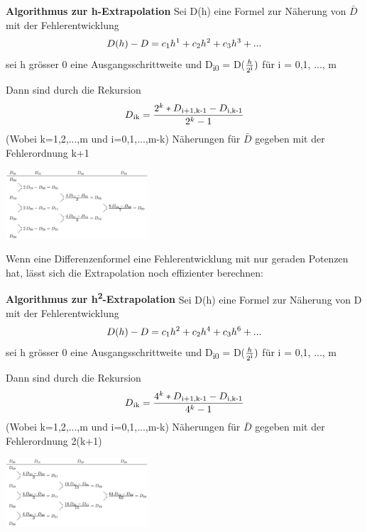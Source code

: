 \documentclass{article}
\newenvironment{Figure}
	{\par\medskip\noindent\minipage{\linewidth}}
	{\endminipage\par\medskip}
\theoremstyle{satz}
\theoremstyle{definition}
\begin{document}
\begin{tcolorbox}
\textbf{Algorithmus zur h-Extrapolation}
Sei D(h) eine Formel zur Näherung von $\bar{D}$ mit der Fehlerentwicklung
\begin{equation}
D(h)-D = c\textsubscript{1}h\textsuperscript{1}+c\textsubscript{2}h\textsuperscript{2}+c\textsubscript{3}h\textsuperscript{3}+...
\end{equation}
sei h grösser 0 eine Ausgangsschrittweite und D\textsubscript{i0} = D($\frac{h}{2\textsuperscript{i}})$ für i = 0,1, ..., m

Dann sind durch die Rekursion
\begin{equation}
D\textsubscript{ik}=\frac{2^k * D\textsubscript{i+1,k-1}-D\textsubscript{i,k-1}}{2^k -1}
\end{equation}
(Wobei k=1,2,...,m und i=0,1,...,m-k) Näherungen für $\bar{D}$ gegeben mit der Fehlerordnung k+1
\end{tcolorbox}

\begin{Figure}
\centering
\includegraphics[width=200px]{img/Schema_h_Extrapolation.png}
	\label{fig:Schema h-Extrapolation}
\end{Figure}

Wenn eine Differenzenformel eine Fehlerentwicklung mit nur geraden Potenzen hat, lässt sich die Extrapolation noch effizienter berechnen:
\begin{tcolorbox}
\textbf{Algorithmus zur h\textsuperscript{2}-Extrapolation}
Sei D(h) eine Formel zur Näherung von D mit der Fehlerentwicklung
\begin{equation}
D(h)-D = c\textsubscript{1}h\textsuperscript{2}+c\textsubscript{2}h\textsuperscript{4}+c\textsubscript{3}h\textsuperscript{6}+...
\end{equation}
sei h grösser 0 eine Ausgangsschrittweite und D\textsubscript{i0} = D($\frac{h}{2\textsuperscript{i}})$ für i = 0,1, ..., m

Dann sind durch die Rekursion
\begin{equation}
D\textsubscript{ik}=\frac{4^k * D\textsubscript{i+1,k-1}-D\textsubscript{i,k-1}}{4^k -1}
\end{equation}
(Wobei k=1,2,...,m und i=0,1,...,m-k) Näherungen für $\bar{D}$ gegeben mit der Fehlerordnung 2(k+1)
\end{tcolorbox}
\begin{Figure}
\centering
\includegraphics[width=200px]{img/Schema_h2_Extrapolation.png}
	\label{fig:Schema $h^2$-Extrapolation}
\end{Figure}
\end{document}
